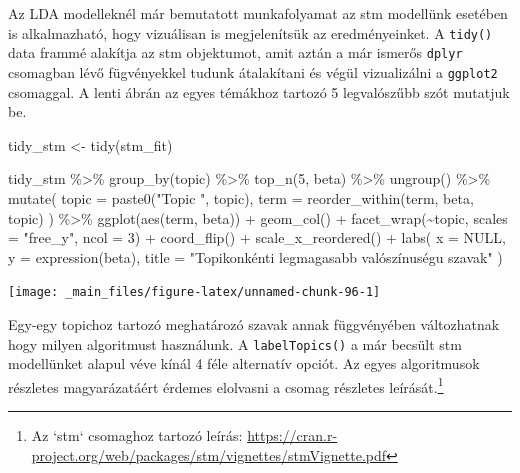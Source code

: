 \documentclass[
]{book}
\newenvironment{Shaded}{\begin{snugshade}}{\end{snugshade}}
\newcommand{\AttributeTok}[1]{\textcolor[rgb]{0.77,0.63,0.00}{#1}}
\newcommand{\ConstantTok}[1]{\textcolor[rgb]{0.00,0.00,0.00}{#1}}
\newcommand{\DecValTok}[1]{\textcolor[rgb]{0.00,0.00,0.81}{#1}}
\newcommand{\FunctionTok}[1]{\textcolor[rgb]{0.00,0.00,0.00}{#1}}
\newcommand{\NormalTok}[1]{#1}
\newcommand{\OtherTok}[1]{\textcolor[rgb]{0.56,0.35,0.01}{#1}}
\newcommand{\SpecialCharTok}[1]{\textcolor[rgb]{0.00,0.00,0.00}{#1}}
\newcommand{\StringTok}[1]{\textcolor[rgb]{0.31,0.60,0.02}{#1}}
\begin{document}
Az LDA modelleknél már bemutatott munkafolyamat az stm modellünk
esetében is alkalmazható, hogy vizuálisan is megjelenítsük az
eredményeinket. A \texttt{tidy()} data frammé alakítja az stm
objektumot, amit aztán a már ismerős \texttt{dplyr} csomagban lévő
fügvényekkel tudunk átalakítani és végül vizualizálni a \texttt{ggplot2}
csomaggal. A lenti ábrán az egyes témákhoz tartozó 5 legvalószűbb szót
mutatjuk be.

\begin{Shaded}
\begin{Highlighting}[]

\NormalTok{tidy\_stm }\OtherTok{\textless{}{-}} \FunctionTok{tidy}\NormalTok{(stm\_fit)}

\NormalTok{tidy\_stm }\SpecialCharTok{\%\textgreater{}\%}
  \FunctionTok{group\_by}\NormalTok{(topic) }\SpecialCharTok{\%\textgreater{}\%}
  \FunctionTok{top\_n}\NormalTok{(}\DecValTok{5}\NormalTok{, beta) }\SpecialCharTok{\%\textgreater{}\%}
  \FunctionTok{ungroup}\NormalTok{() }\SpecialCharTok{\%\textgreater{}\%}
  \FunctionTok{mutate}\NormalTok{(}
    \AttributeTok{topic =} \FunctionTok{paste0}\NormalTok{(}\StringTok{"Topic "}\NormalTok{, topic),}
    \AttributeTok{term =} \FunctionTok{reorder\_within}\NormalTok{(term, beta, topic)}
\NormalTok{  ) }\SpecialCharTok{\%\textgreater{}\%}
  \FunctionTok{ggplot}\NormalTok{(}\FunctionTok{aes}\NormalTok{(term, beta)) }\SpecialCharTok{+}
  \FunctionTok{geom\_col}\NormalTok{() }\SpecialCharTok{+}
  \FunctionTok{facet\_wrap}\NormalTok{(}\SpecialCharTok{\textasciitilde{}}\NormalTok{topic, }\AttributeTok{scales =} \StringTok{"free\_y"}\NormalTok{, }\AttributeTok{ncol =} \DecValTok{3}\NormalTok{) }\SpecialCharTok{+}
  \FunctionTok{coord\_flip}\NormalTok{() }\SpecialCharTok{+}
  \FunctionTok{scale\_x\_reordered}\NormalTok{() }\SpecialCharTok{+}
  \FunctionTok{labs}\NormalTok{(}
    \AttributeTok{x =} \ConstantTok{NULL}\NormalTok{,}
    \AttributeTok{y =} \FunctionTok{expression}\NormalTok{(beta),}
    \AttributeTok{title =} \StringTok{"Topikonkénti legmagasabb valószínuségu szavak"}
\NormalTok{  )}
\end{Highlighting}
\end{Shaded}

\begin{center}\texttt{[image: \_main\_files/figure-latex/unnamed-chunk-96-1]} \end{center}

Egy-egy topichoz tartozó meghatározó szavak annak függvényében
változhatnak hogy milyen algoritmust használunk. A
\texttt{labelTopics()} a már becsült stm modellünket alapul véve kínál 4
féle alternatív opciót. Az egyes algoritmusok részletes magyarázatáért
érdemes elolvasni a csomag részletes leírását.\footnote{Az `stm`
  csomaghoz tartozó leírás:
  \url{https://cran.r-project.org/web/packages/stm/vignettes/stmVignette.pdf}}
\end{document}
